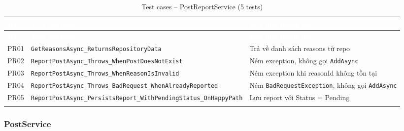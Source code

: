 \documentclass[a4paper]{article}
\begin{document}
\begin{longtable}{|C{0.8cm}|L{5.4cm}|L{7.4cm}|}
\hline
{}
\textcolor{white}{\textbf{ID}} &
\textcolor{white}{\textbf{Test Method}} &
\textcolor{white}{\textbf{Kết quả mong đợi}} \\
\hline
\endfirsthead
\hline
{}
\textcolor{white}{\textbf{ID}} &
\textcolor{white}{\textbf{Test Method}} &
\textcolor{white}{\textbf{Kết quả mong đợi}} \\
\hline
\endhead
\hline
\endfoot

PR01 & \texttt{GetReasonsAsync\_ReturnsRepositoryData} & Trả về danh sách reasons từ repo \\
\hline
PR02 & \texttt{ReportPostAsync\_Throws\_WhenPostDoesNotExist} & Ném exception, không gọi \texttt{AddAsync} \\
\hline
{}
PR03 & \texttt{ReportPostAsync\_Throws\_WhenReasonIsInvalid} & Ném exception khi reasonId không tồn tại \\
\hline
PR04 & \texttt{ReportPostAsync\_Throws\_BadRequest\_WhenAlreadyReported} & Ném \texttt{BadRequestException}, không gọi \texttt{AddAsync} \\
\hline
{}
PR05 & \texttt{ReportPostAsync\_PersistsReport\_WithPendingStatus\_OnHappyPath} & Lưu report với Status = Pending \\
\hline
\caption{Test cases -- PostReportService (5 tests)}
\end{longtable}

\subsubsection{PostService}
\end{document}
